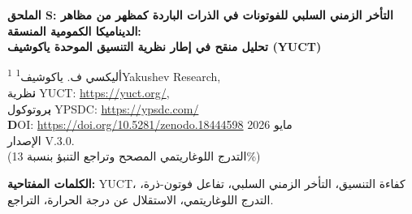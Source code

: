 \documentclass[12pt,a4paper]{article}
\newcommand{\Keff}{K_{\mathrm{eff}}}
\newcommand{\kappac}{\kappa_c}
\newcommand{\eps}{\varepsilon}
\newcommand{\betac}{\beta}
\begin{document}
	
	\begin{titlepage}
		\centering
		\vspace*{1cm}
		{\Huge\bfseries الملحق S: التأخر الزمني السلبي للفوتونات في الذرات الباردة كمظهر من مظاهر الديناميكا الكمومية المنسقة: \\ تحليل منقح في إطار نظرية التنسيق الموحدة ياكوشيف (YUCT)}
		\vspace{1cm}
		
		{\large أليكسي ف. ياكوشيف\textsuperscript{1}}
		\vspace{0.3cm}
		{\normalsize \textsuperscript{1}Yakushev Research, \\ 
			\textbf نظرية YUCT: \url{https://yuct.org/}, \\ 
			\textbf بروتوكول YPSDC: \url{https://ypsdc.com/}\\
			\textbf DOI: \url{https://doi.org/10.5281/zenodo.18444598}}
		\vspace{1cm}
		{\normalsize مايو 2026 \\ \large الإصدار V.3.0. \\(التدرج اللوغاريتمي المصحح وتراجع التنبؤ بنسبة 13\%)}
		
		\vfill
		
		\begin{abstract}
			\noindent
			أظهرت تجارب حديثة رائدة (Angulo وآخرون، 2024) أن الفوتونات التي تعبر سحابة ذرية فائقة البرودة يمكن أن تخرج من الوسط بتأخر زمني سلبي – حيث تظهر قمة الحزمة الموجية في وقت أبكر مما دخلت فيه. هذه الظاهرة غير البديهية، مع أنها لا تنتهك السببية، تكشف عن تأثيرات تداخل كمومي عميقة. في هذا العمل، نعيد النظر في التفسير في إطار نظرية التنسيق الموحدة ياكوشيف (YUCT). بالبناء على قانون التدرج العام \(\eps = \kappac \alpha (\ln\Keff)^{\betac}\) مع \(\betac = 2/3\) و \(\kappac = 1/3\) (المشتق في الملحق X)، نظهر أن العلاقة الصحيحة بين التأخر الجماعي \(\tau_g\) وكفاءة التنسيق \(\Keff\) هي علاقة لوغاريتمية: \(|\tau_g| = \alpha_0 \ln\Keff\). وجود التأخرات الزمنية السلبية مؤكد بالفعل بالتجربة؛ وقد لوحظت قيم تصل إلى \((-1.14 \pm 0.22)\tau_0\). ومع ذلك، وخلافًا للافتراض الخطي السابق، فإن الشكل اللوغاريتمي يعني أن الاعتماد على درجة الحرارة لـ \(\tau_g\) ضعيف للغاية. باستخدام التدهور الحراري القانوني \(\Keff(T) = K_0 (T/T_0)^{-\gamma}\) مع \(\gamma \approx 0.30\) (المشتق من بيانات جيوفيزيائية)، نجد أن التغير النسبي في \(|\tau_g|\) عند مضاعفة درجة الحرارة هو من رتبة \(10^{-8}\)، أي أقل بكثير من حساسية التجارب الحالية. وبالتالي، فإن التأثير المزعوم بنسبة 13\% هو نتيجة مصطنعة لنموذج خطي خاطئ ويجب التراجع عنه. نقدم الإطار النظري المصحح ونناقش اختبارات تجريبية بديلة يمكن أن تكون حساسة للتدرج اللوغاريتمي، مثل تغيير العمق البصري أو مدة النبضة. يبقى التنبؤ الأساسي لـ YUCT – أن التأخرات الجماعية السلبية هي مظهر من مظاهر كفاءة التنسيق – صحيحًا، لكن قابليته للاختبار في أنظمة الذرات الباردة تتطلب إعدادات محسنة.
		\end{abstract}
		
		\vspace{0.5cm}
		\noindent\textbf{الكلمات المفتاحية:} YUCT، كفاءة التنسيق، التأخر الزمني السلبي، تفاعل فوتون-ذرة، التدرج اللوغاريتمي، الاستقلال عن درجة الحرارة، التراجع.
		
	\end{titlepage}
	
\end{document}

